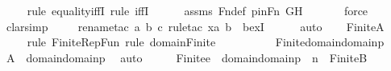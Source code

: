 \begin{isabellebody}
\ \ \ \ \isamarkupfalse%
{\isacharparenleft}{\kern0pt}rule\ equality{\isacharunderscore}{\kern0pt}iffI{\isacharcomma}{\kern0pt}\ rule\ iffI{\isacharparenright}{\kern0pt}\isanewline
\ \ \ \ \isamarkupfalse%
\ assms\ Fn{\isacharunderscore}{\kern0pt}def\ pinFn\ GH\isanewline
\ \ \ \ \ \isamarkupfalse%
\ force\isanewline
\ \ \ \ \isamarkupfalse%
\ clarsimp\isanewline
\ \ \ \ \isamarkupfalse%
{\isacharparenleft}{\kern0pt}rename{\isacharunderscore}{\kern0pt}tac\ a\ b\ c{\isacharcomma}{\kern0pt}\ rule{\isacharunderscore}{\kern0pt}tac\ x{\isacharequal}{\kern0pt}{\isachardoublequoteopen}{\isacharless}{\kern0pt}a{\isacharcomma}{\kern0pt}\ b{\isachargreater}{\kern0pt}{\isachardoublequoteclose}\ \ bexI{\isacharparenright}{\kern0pt}\isanewline
\ \ \ \ \isamarkupfalse%
\ auto\isanewline
\ \ \isamarkupfalse%
\ {\isachardoublequoteopen}Finite{\isacharparenleft}{\kern0pt}{\isacharquery}{\kern0pt}A{\isacharparenright}{\kern0pt}{\isachardoublequoteclose}\ \isanewline
\ \ \ \ \isamarkupfalse%
{\isacharparenleft}{\kern0pt}rule\ Finite{\isacharunderscore}{\kern0pt}RepFun{\isacharcomma}{\kern0pt}\ rule\ domain{\isacharunderscore}{\kern0pt}Finite{\isacharparenright}{\kern0pt}\isanewline
\ \ \ \ \isamarkupfalse%
\isanewline
\ \ \isamarkupfalse%
\ \isamarkupfalse%
\ {\isachardoublequoteopen}Finite{\isacharparenleft}{\kern0pt}domain{\isacharparenleft}{\kern0pt}domain{\isacharparenleft}{\kern0pt}p{\isacharparenright}{\kern0pt}{\isacharparenright}{\kern0pt}{\isacharparenright}{\kern0pt}{\isachardoublequoteclose}\ \isamarkupfalse%
\ {\isacartoucheopen}{\isacharquery}{\kern0pt}A\ {\isacharequal}{\kern0pt}\ domain{\isacharparenleft}{\kern0pt}domain{\isacharparenleft}{\kern0pt}p{\isacharparenright}{\kern0pt}{\isacharparenright}{\kern0pt}{\isacartoucheclose}\ \isamarkupfalse%
\ auto\isanewline
\ \ \isamarkupfalse%
\ \isamarkupfalse%
\ {\isachardoublequoteopen}Finite{\isacharparenleft}{\kern0pt}e\ {\isasymunion}\ domain{\isacharparenleft}{\kern0pt}domain{\isacharparenleft}{\kern0pt}p{\isacharparenright}{\kern0pt}{\isacharparenright}{\kern0pt}\ {\isasymunion}\ {\isacharbraceleft}{\kern0pt}n{\isacharbraceright}{\kern0pt}{\isacharparenright}{\kern0pt}{\isachardoublequoteclose}\ {\isacharparenleft}{\kern0pt}\ {\isachardoublequoteopen}Finite{\isacharparenleft}{\kern0pt}{\isacharquery}{\kern0pt}B{\isacharparenright}{\kern0pt}{\isachardoublequoteclose}{\isacharparenright}{\kern0pt}\isanewline

\end{isabellebody}
